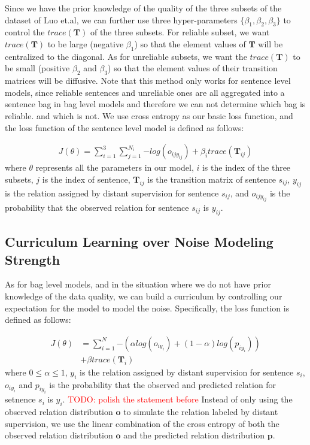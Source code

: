\documentclass[11pt,a4paper]{article}
\newcommand{\todo}[1]{\textcolor{red}{TODO: #1}\PackageWarning{TODO:}{#1!}}
\begin{document}
Since we have the prior knowledge of the quality of the three subsets of the dataset of Luo et.al, we can further use three hyper-parameters $\{\beta_1, \beta_2, \beta_3\}$ to control the $trace(\mathbf{T})$ of the three subsets. For reliable subset, we want $trace(\mathbf{T})$ to be large (negative $\beta_1$) so that the element values of $\mathbf{T}$ will be centralized to the diagonal. As for unreliable subsets, we want the $trace(\mathbf{T})$ to be small (positive $\beta_2$ and $\beta_3$) so that the element values of their transition matrices will be diffusive. Note that this method only works for sentence level models, since reliable sentences and unreliable ones are all aggregated into a sentence bag in bag level models and therefore we can not determine which bag is reliable. and which is not. We use cross entropy as our basic loss function, and the loss function of the sentence level model is defined as follows:

\begin{equation}
\begin{aligned}
J(\theta)=\sum_{i=1}^3{\sum_{j=1}^{N_i}{-log(o_{ijy_{ij}})}} + \beta_i trace(\mathbf{T}_{ij})
\end{aligned}
\end{equation}
where $\theta$ represents all the parameters in our model, $i$ is the index of the three subsets, $j$ is the index of sentence, $\mathbf{T}_{ij}$ is the transition matrix of sentence $s_{ij}$, $y_{ij}$ is the relation assigned by distant supervision for sentence $s_{ij}$, and $o_{ijy_{ij}}$ is the probability that the observed relation for sentence $s_{ij}$ is $y_{ij}$.

\subsection{Curriculum Learning over Noise Modeling Strength}
As for bag level models, and in the situation where we do not have prior knowledge of the data quality, we can build a curriculum by controlling our expectation for the model to model the noise. Specifically, the loss function is defined as follows:

\begin{equation}
\begin{aligned}
J(\theta)	&=\sum_{i=1}^N{-(\alpha log(o_{iy_{i}}) + (1-\alpha) log(p_{iy_{i}}))} \\
&+ \beta trace(\mathbf{T}_{i})
\end{aligned}
\end{equation}
where $0\le\alpha\le1$, $y_i$ is the relation assigned by distant supervision for sentence $s_i$, $o_{iy_{i}}$ and $p_{iy_{i}}$ is the probability that the observed and predicted relation for setnence $s_i$ is $y_i$. \todo{polish the statement before} Instead of only using the observed relation distribution $\mathbf{o}$ to simulate the relation labeled by distant supervision, we use the linear combination of the cross entropy of both the observed relation distribution $\mathbf{o}$ and the predicted relation distribution $\mathbf{p}$. 
\end{document}
